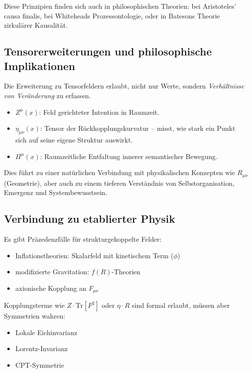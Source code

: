 \documentclass[11pt]{article}
\begin{document}
Diese Prinzipien finden sich auch in philosophischen Theorien: bei Aristoteles' causa finalis, bei Whiteheads Prozessontologie,  
oder in Batesons Theorie zirkulärer Kausalität.

\subsection*{Tensorerweiterungen und philosophische Implikationen}

Die Erweiterung zu Tensorfeldern erlaubt, nicht nur Werte, sondern \textit{Verhältnisse von Veränderung} zu erfassen.

\begin{itemize}
  \item $Z^\mu(x)$: Feld gerichteter Intention in Raumzeit.
  \item $\eta_{\mu\nu}(x)$: Tensor der Rückkopplungskurvatur – misst, wie stark ein Punkt sich auf seine eigene Struktur auswirkt.
  \item $\Pi^\mu(x)$: Raumzeitliche Entfaltung innerer semantischer Bewegung.
\end{itemize}

Dies führt zu einer natürlichen Verbindung mit physikalischen Konzepten wie $R_{\mu\nu}$ (Geometrie),  
aber auch zu einem tieferen Verständnis von Selbstorganisation, Emergenz und Systembewusstsein.

\subsection*{Verbindung zu etablierter Physik}

Es gibt Präzedenzfälle für strukturgekoppelte Felder:

\begin{itemize}
  \item Inflationstheorien: Skalarfeld mit kinetischem Term ($\phi$)
  \item modifizierte Gravitation: $f(R)$-Theorien
  \item axionische Kopplung an $F_{\mu\nu}$
\end{itemize}

Kopplungsterme wie $Z \cdot \mathrm{Tr}[F^2]$ oder $\eta \cdot R$ sind formal erlaubt,  
müssen aber Symmetrien wahren:
\begin{itemize}
  \item Lokale Eichinvarianz
  \item Lorentz-Invarianz
  \item CPT-Symmetrie
\end{itemize}
\end{document}
